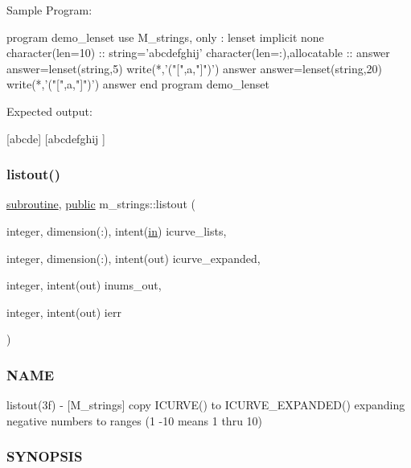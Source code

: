 \begin{DoxyVerb}Sample Program:

 program demo_lenset
  use M_strings, only : lenset
  implicit none
  character(len=10)            :: string='abcdefghij'
  character(len=:),allocatable :: answer
     answer=lenset(string,5)
     write(*,'("[",a,"]")') answer
     answer=lenset(string,20)
     write(*,'("[",a,"]")') answer
 end program demo_lenset

Expected output:

 [abcde]
 [abcdefghij          ] \end{DoxyVerb}
 \mbox{\label{namespacem__strings_a81b4b7f4f301b9e17604adbcace58d0c}} 
\subsubsection{\texorpdfstring{listout()}{listout()}}
{\footnotesize\ttfamily \hyperlink{M__stopwatch_83_8txt_acfbcff50169d691ff02d4a123ed70482}{subroutine}, \hyperlink{M__stopwatch_83_8txt_a2f74811300c361e53b430611a7d1769f}{public} m\+\_\+strings\+::listout (\begin{DoxyParamCaption}\item[{integer, dimension(\+:), intent(\hyperlink{M__journal_83_8txt_afce72651d1eed785a2132bee863b2f38}{in})}]{icurve\+\_\+lists,  }\item[{integer, dimension(\+:), intent(out)}]{icurve\+\_\+expanded,  }\item[{integer, intent(out)}]{inums\+\_\+out,  }\item[{integer, intent(out)}]{ierr }\end{DoxyParamCaption})}



\subsubsection*{N\+A\+ME}

listout(3f) -\/ \mbox{[}M\+\_\+strings\mbox{]} copy I\+C\+U\+R\+V\+E() to I\+C\+U\+R\+V\+E\+\_\+\+E\+X\+P\+A\+N\+D\+E\+D() expanding negative numbers to ranges (1 -\/10 means 1 thru 10) 

\subsubsection*{S\+Y\+N\+O\+P\+S\+IS}

